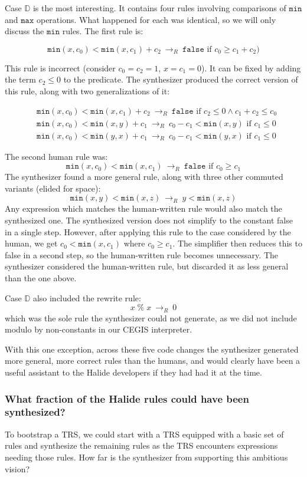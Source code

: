 \documentclass[acmsmall]{acmart}\settopmatter{}
\newcommand{\hmax}[0]{\texttt{max}}
\newcommand{\hmin}[0]{\texttt{min}}
\newcommand{\rewrites}[0]{\:\rightarrow_{R}\:}
\newcommand{\pred}[0]{\textrm{ if }}
\newcommand{\hfalse}[0]{\texttt{false}}
\begin{document}
Case $\mathbb{D}$ is the most interesting. It contains four rules involving comparisons of $\hmin$ and $\hmax$ operations. What happened for each was identical, so we will only discuss the $\hmin$ rules. The first rule is:

\[
\hmin(x, c_0) < \hmin(x, c_1) + c_2 \rewrites \hfalse \pred c_0 \geq c_1 + c_2)
\]

This rule is incorrect (consider $c_0 = c_2 = 1$, $x = c_1 = 0$). It can be fixed by adding the term $c_2 \leq 0$ to the predicate. The synthesizer produced the correct version of this rule, along with two generalizations of it:

\begin{align*}
& \hmin(x, c_0) < \hmin(x, c_1) + c_2 \rewrites  \hfalse \pred c_2 \leq 0 \wedge c_1 + c_2 \leq c_0 \\
& \hmin(x, c_0) < \hmin(x, y) + c_1 \rewrites c_0 - c_1 < \hmin(x, y) \pred c_1 \leq 0 \\
& \hmin(x, c_0) < \hmin(y, x) + c_1 \rewrites c_0 - c_1 < \hmin(y, x) \pred c_1 \leq 0
\end{align*}

The second human rule was:
\[
\hmin(x, c_0) < \hmin(x, c_1) \rewrites \hfalse \pred c_0 \geq c_1
\]
The synthesizer found a more general rule, along with three other commuted variants (elided for space):
\[
\hmin(x, y) < \hmin(x, z) \rewrites y < \hmin(x, z)
\]
Any expression which matches the human-written rule would also match the synthesized one. The synthesized version does not simplify to the constant false in a single step. However, after applying this rule to the case considered by the human, we get $c_0 < \hmin(x, c_1)$ where $c_0 \geq c_1$. The simplifier then reduces this to false in a second step, so the human-written rule becomes unnecessary. The synthesizer considered the human-written rule, but discarded it as less general than the one above.

Case $\mathbb{D}$ also included the rewrite rule: 
\[
x\; \%\; x \rewrites 0
\]
which was the sole rule the synthesizer could not generate, as we did not include modulo by non-constants in our CEGIS interpreter.

With this one exception, across these five code changes the synthesizer generated more general, more correct rules than the humans, and would clearly have been a useful assistant to the Halide developers if they had had it at the time.


\subsubsection{What fraction of the Halide rules could have been synthesized?}
\label{sub:replacementexperiment}
To bootstrap a TRS, we could start with a TRS equipped with a basic set of rules and synthesize the remaining rules as the TRS encounters expressions needing those rules.  How far is the synthesizer from supporting this ambitious vision?
\end{document}
